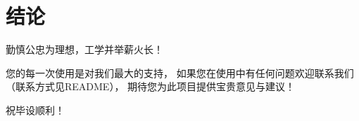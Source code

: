 \chapter*{结论}     %

勤慎公忠为理想，工学并举薪火长！

您的每一次使用是对我们最大的支持，
如果您在使用中有任何问题欢迎联系我们（联系方式见README），
期待您为此项目提供宝贵意见与建议！

祝毕设顺利！
